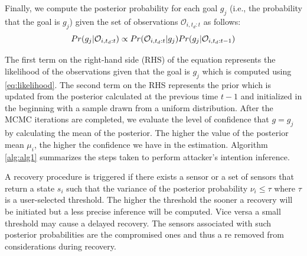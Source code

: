 \documentclass[letterpaper, 10 pt, conference]{ieeeconf}  %
\newcommand\NB[1]{$\spadesuit$\footnote{NB: #1}}
\begin{document}
Finally, we compute the posterior probability for each goal $g_j$ (i.e., the probability  that the goal is $g_j$) given the set of observations $\mathcal{O}_{i,t_d:t}$ as follows: %
\begin{equation} Pr(g_j|\mathcal{O}_{i,t_d:t}) \propto Pr(\mathcal{O}_{i,t_d:t} | g_j) \\ Pr(g_j|\mathcal{O}_{i,t_d:t-1})
\label{eqn:goal_posterior}
\end{equation}

The first term on the right-hand side (RHS) of the equation represents the likelihood of the observations given that the goal is $g_j$ which is computed using \eqref{eq:likelihood}. The second term on the RHS represents the prior which is updated from the posterior calculated at the previous time $t-1$ and initialized in the beginning with a sample drawn from a uniform distribution.
After the MCMC iterations are completed, we evaluate the level of confidence that $g = g_j$ by calculating the mean of the posterior. The higher the value of the posterior mean $\mu_i$, the higher the confidence we have in the estimation. Algorithm \ref{alg:alg1} summarizes the steps taken to perform attacker's intention inference.

A recovery procedure is triggered if there exists a sensor or a set of sensors that return a state $s_i$ such that the variance of the posterior probability $\nu_i \leq \tau$ where $\tau$ is a user-selected threshold. The higher the threshold the sooner a recovery will be initiated but a less precise inference will be computed. Vice versa a small threshold may cause a delayed recovery. The sensors associated with such posterior probabilities are the compromised ones and thus a re removed from considerations during recovery.

\end{document}
